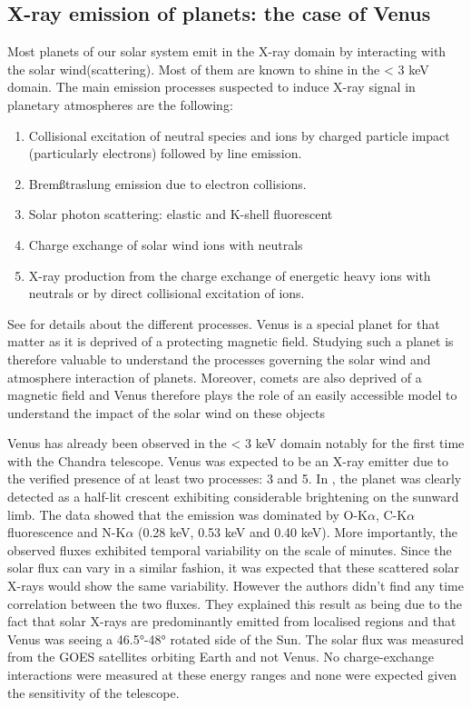     \subsection{X-ray emission of planets: the case of Venus}  
    Most planets of our solar system emit in the X-ray domain by interacting with the solar wind(scattering). Most of them are known to shine in the < 3 keV domain. The main emission processes suspected to induce X-ray signal in planetary atmospheres are the following\cite{BhardwajX-raysObjects}:

    \begin{enumerate}
        \item Collisional excitation of neutral species and ions by charged particle impact
        (particularly electrons) followed by line emission.
        \item Brem\ss traslung emission due to electron collisions.
        \item Solar photon scattering: elastic and K-shell fluorescent
        \item Charge exchange of solar wind ions with neutrals
        \item X-ray production from the charge exchange of energetic heavy ions
        with neutrals or by direct collisional excitation of ions.
    \end{enumerate}
    See \cite{BhardwajX-raysObjects} for details about the different processes. Venus is a special planet for that matter as it is deprived of a protecting magnetic field. Studying such a planet is therefore valuable to understand the processes governing the solar wind and atmosphere interaction of planets. Moreover, comets are also deprived of a magnetic field and Venus therefore plays the role of an easily accessible model to understand the impact of the solar wind on these objects
    

    Venus has already been observed in the < 3 keV domain notably for the first time with the Chandra telescope\autocite{Dennerl2002DiscoveryChandra}. Venus was expected to be an X-ray emitter due to the verified presence of at least two processes: 3 and 5. In \cite{Dennerl2002DiscoveryChandra}, the planet was clearly detected as a half-lit crescent exhibiting considerable brightening on the sunward limb. The data showed that the emission was dominated by O-K$\alpha$, C-K$\alpha$ fluorescence and N-K$\alpha$ (0.28 keV, 0.53 keV and 0.40 keV). More importantly, the observed fluxes exhibited temporal variability on the scale of minutes. Since the solar flux can vary in a similar fashion, it was expected that these scattered solar X-rays would show the same variability. However the authors didn't find any time correlation between the two fluxes. They explained this result as being due to the fact that solar X-rays are predominantly emitted from localised regions and that Venus was seeing a  46.5°-48° rotated side of the Sun. The solar flux was measured from the GOES satellites orbiting Earth and not Venus. No charge-exchange interactions were measured at these energy ranges and none were expected given the sensitivity of the telescope.

